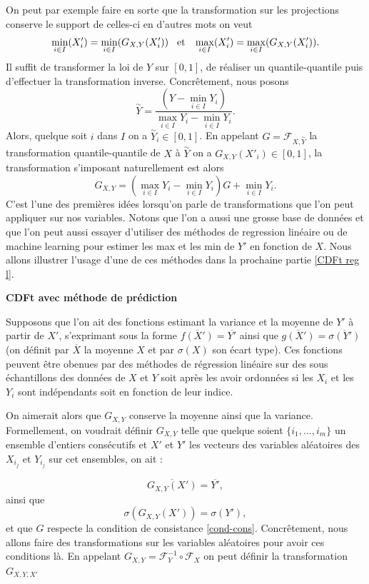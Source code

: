 \documentclass[a4paper,11pt]{article}
\numberwithin{equation}{section}
\begin{document}
On peut par exemple faire en sorte que la transformation sur les projections conserve le support de celles-ci en d'autres mots on veut
\[ \min_{i \in I}(X'_i)=\min_{i \in I}(G_{X,Y}(X'_i)) \hspace{3mm} \textrm{et} \hspace{3mm}  \max_{i \in I}(X'_i)=\max_{i \in I}(G_{X,Y}(X'_i)).\]
Il suffit de transformer la loi de $Y$ sur $[0,1]$, de réaliser un quantile-quantile puis d'effectuer la transformation inverse. Concrêtement, nous posons 
\[\overset{\sim}{Y}= \frac{(Y-\min_{i\in I}Y_i)}{\max_{i\in I}Y_i- \min_{i\in I}Y_i}.\]
Alors, quelque soit $i$ dans $I$ on a $\overset{\sim}{Y}_i \in [0,1]$. En appelant $G= \mathcal{F}_{X,\overset{\sim}{Y}}$ la transformation quantile-quantile de $X$ à $\overset{\sim}{Y}$ on a $G_{X,Y}(X'_i) \in [0,1]$, la transformation s'imposant naturellement est alors
\[ G_{X,Y}= (\max_{i\in I}Y_i- \min_{i\in I}Y_i)G + \min_{i\in I}Y_i.\]
C'est l'une des premières idées lorsqu'on parle de transformations que l'on peut appliquer sur nos variables. Notons que l'on a aussi une grosse base de données et que l'on peut aussi essayer d'utiliser des méthodes de regression linéaire ou de machine learning pour estimer les max et les min de $Y'$ en fonction de $X$. Nous allons illustrer l'usage d'une de ces méthodes dans la prochaine partie \ref{CDFt reg l}.

\vspace{0.7cm}

\noindent \textbf{CDFt avec méthode de prédiction}
\label{CDFt reg l}

Supposons que l'on ait des fonctions estimant la variance et la moyenne de $Y'$ à partir de $X'$, s'exprimant sous la forme $\overline{f(X')} = \overline{Y'}$ ainsi que $\overline{g(X')} = \overline{\sigma(Y')}$ (on définit par $\overline{X}$ la  moyenne $X$ et par $\sigma(X)$ son écart type). Ces fonctions peuvent être obenues par des méthodes de régression linéaire sur des sous échantillons des données de $X$ et $Y$ soit après les avoir ordonnées si les $X_i$ et les $Y_i$ sont indépendants soit en fonction de leur indice.

On aimerait alors que $G_{X,Y}$ conserve la moyenne ainsi que la variance. Formellement, on voudrait définir $G_{X,Y}$ telle que quelque soient $\{i_1,...,i_m\}$ un ensemble d'entiers consécutifs et $X'$ et $Y'$ les vecteurs des variables aléatoires des $X_{i_j}$ et $Y_{i_j}$ sur cet ensembles, on ait :

\begin{equation}
	\label{cond-mu}
	\overline{G_{X,Y}(X')}=\overline{Y'},
\end{equation}
ainsi que
\begin{equation}
	\label{cond-sigma}
	\sigma({G_{X,Y}(X')})=\sigma(Y'),
\end{equation}
et que $G$ respecte la condition de consistance \eqref{cond-cons}.
Concrêtement, nous allons faire des transformations sur les variables aléatoires pour avoir ces conditions là. En appelant $G_{X,Y}= \mathcal{F}^{-1}_{Y}\circ\mathcal{F}_{X}$ on peut définir la transformation $G_{X,Y,X'}$
\end{document}

